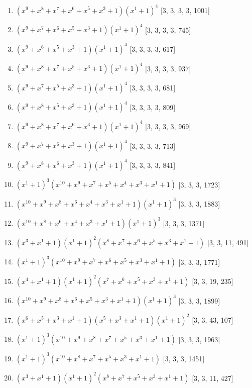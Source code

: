\documentclass[10pt,twocolumn]{article}
\begin{document}
\begin{enumerate}
\item $(x^{9} + x^{8} + x^{7} + x^{6} + x^{5} + x^{3} + 1)(x^{1} + 1)^{4}$  [3, 3, 3, 3, 1001]
\item $(x^{9} + x^{7} + x^{6} + x^{5} + x^{3} + 1)(x^{1} + 1)^{4}$  [3, 3, 3, 3, 745]
\item $(x^{9} + x^{6} + x^{5} + x^{3} + 1)(x^{1} + 1)^{4}$  [3, 3, 3, 3, 617]
\item $(x^{9} + x^{8} + x^{7} + x^{5} + x^{3} + 1)(x^{1} + 1)^{4}$  [3, 3, 3, 3, 937]
\item $(x^{9} + x^{7} + x^{5} + x^{3} + 1)(x^{1} + 1)^{4}$  [3, 3, 3, 3, 681]
\item $(x^{9} + x^{8} + x^{5} + x^{3} + 1)(x^{1} + 1)^{4}$  [3, 3, 3, 3, 809]
\item $(x^{9} + x^{8} + x^{7} + x^{6} + x^{3} + 1)(x^{1} + 1)^{4}$  [3, 3, 3, 3, 969]
\item $(x^{9} + x^{7} + x^{6} + x^{3} + 1)(x^{1} + 1)^{4}$  [3, 3, 3, 3, 713]
\item $(x^{9} + x^{8} + x^{6} + x^{3} + 1)(x^{1} + 1)^{4}$  [3, 3, 3, 3, 841]
\item $(x^{1} + 1)^{3}(x^{10} + x^{9} + x^{7} + x^{5} + x^{4} + x^{3} + x^{1} + 1)$  [3, 3, 3, 1723]
\item $(x^{10} + x^{9} + x^{8} + x^{6} + x^{4} + x^{3} + x^{1} + 1)(x^{1} + 1)^{3}$  [3, 3, 3, 1883]
\item $(x^{10} + x^{8} + x^{6} + x^{4} + x^{3} + x^{1} + 1)(x^{1} + 1)^{3}$  [3, 3, 3, 1371]
\item $(x^{3} + x^{1} + 1)(x^{1} + 1)^{2}(x^{8} + x^{7} + x^{6} + x^{5} + x^{3} + x^{1} + 1)$  [3, 3, 11, 491]
\item $(x^{1} + 1)^{3}(x^{10} + x^{9} + x^{7} + x^{6} + x^{5} + x^{3} + x^{1} + 1)$  [3, 3, 3, 1771]
\item $(x^{4} + x^{1} + 1)(x^{1} + 1)^{2}(x^{7} + x^{6} + x^{5} + x^{3} + x^{1} + 1)$  [3, 3, 19, 235]
\item $(x^{10} + x^{9} + x^{8} + x^{6} + x^{5} + x^{3} + x^{1} + 1)(x^{1} + 1)^{3}$  [3, 3, 3, 1899]
\item $(x^{6} + x^{5} + x^{3} + x^{1} + 1)(x^{5} + x^{3} + x^{1} + 1)(x^{1} + 1)^{2}$  [3, 3, 43, 107]
\item $(x^{1} + 1)^{3}(x^{10} + x^{9} + x^{8} + x^{7} + x^{5} + x^{3} + x^{1} + 1)$  [3, 3, 3, 1963]
\item $(x^{1} + 1)^{3}(x^{10} + x^{8} + x^{7} + x^{5} + x^{3} + x^{1} + 1)$  [3, 3, 3, 1451]
\item $(x^{3} + x^{1} + 1)(x^{1} + 1)^{2}(x^{8} + x^{7} + x^{5} + x^{3} + x^{1} + 1)$  [3, 3, 11, 427]

\end{enumerate}
\end{document}
